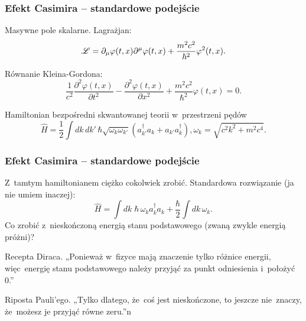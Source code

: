 \documentclass[10pt,t]{beamer}
\begin{document}
\begin{frame}
  \frametitle{Efekt Casimira -- standardowe podejście}


  Masywne pole skalarne.
  Lagrażjan:
  \begin{equation}
    \label{eq:O-roznych-03}
    \mathcal{L} =
    \partial_{ \mu } \varphi( t, x ) \partial^{ \mu } \varphi( t, x )
    + \frac{ m^{ 2 } c^{ 2 } }{ \hbar^{ 2 } } \varphi^{ 2 }( t, x ).
  \end{equation}

  Równanie Kleina-Gordona:
  \begin{equation}
    \label{eq:O-roznych-04}
    \frac{ 1 }{ c^{ 2 } }
    \frac{ \partial^{ 2 } \varphi( t, x ) }{ \partial t^{ 2 } }
    - \frac{ \partial^{ 2 } \varphi( t, x ) }{ \partial x^{ 2 } }
    + \frac{ m^{ 2 } c^{ 2 } }{ \hbar^{ 2 } } \varphi( t, x ) = 0.
  \end{equation}

  Hamiltonian bezpośredni skwantowanej teorii w~przestrzeni pędów
  \begin{subequations}
    \begin{equation}
      \label{eq:O-roznych-04-A}
      \widehat{H} =
      \frac{ 1 }{ 2 } \int dk \, dk' \, \hbar
      \sqrt{ \omega_{ k } \omega_{ k' } } ( a_{ k' }^{ \dagger } a_{ k } + a_{ k' } a_{ k }^{ \dagger } ),
    \end{equation}
    \begin{equation}
      \label{eq:O-roznych-04-B}
      \omega_{ k } = \sqrt{ c^{ 2 } k^{ 2 } + m^{ 2 } c^{ 4 } }.
    \end{equation}
  \end{subequations}

\end{frame}





\begin{frame}
  \frametitle{Efekt Casimira -- standardowe podejście}


  Z~tamtym hamiltonianem ciężko cokolwiek zrobić.
  Standardowa rozwiązanie (ja nie umiem inaczej):
  \begin{equation}
    \label{eq:O-roznych-05}
    \widehat{H} =
    \int dk \; \hbar \, \omega_{ k } a_{ k }^{ \dagger } a_{ k }
    + \frac{ \hbar }{ 2 } \int dk \, \omega_{ k }.
  \end{equation}
  Co zrobić z~nieskończoną energią stanu podstawowego (zwaną zwykle
  energią próżni)?

  Recepta Diraca.
  „Ponieważ w~fizyce mają znaczenie tylko różnice energii,
  więc~energię stanu podstawowego należy przyjąć za punkt
  odniesienia i~położyć 0.”

  Riposta Pauli’ego. „Tylko dlatego, że~coś jest nieskończone, to jeszcze
  nie~znaczy, że~możesz je przyjąć równe zeru.”n

\end{frame}
\end{document}
